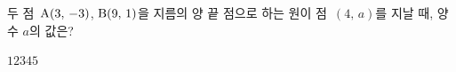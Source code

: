 두 점~$\mathrm{A}(3,\,-3)$, $\mathrm{B}(9,\,1)$을 지름의 양 끝 점으로 하는 원이 점~$(4,\,a)$를 지날 때, 양수 $a$의 값은?
\begin{choices32}{$1$}{$2$}{$3$}{$4$}{$5$}\end{choices32}
